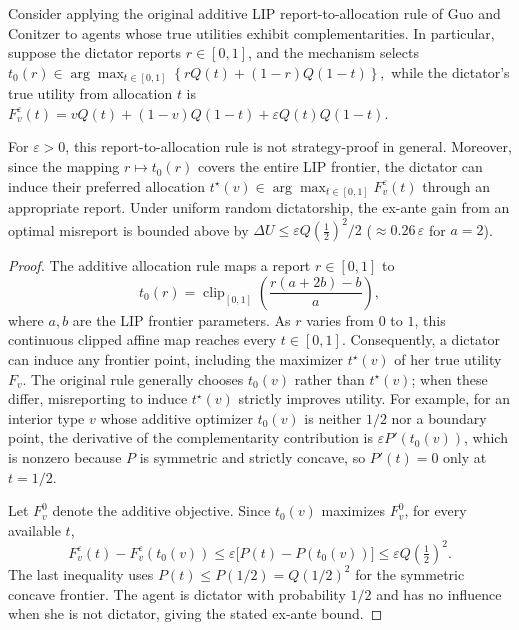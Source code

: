 \begin{proposition}
\label{prop:additive-lip}

Consider applying the original additive LIP report-to-allocation
rule of Guo and Conitzer to agents whose true utilities exhibit
complementarities. In particular, suppose the dictator reports
$r\in[0,1]$, and the mechanism selects $t_0(r)\in\arg\max_{t\in[0,1]}
\left\{rQ(t)+(1-r)Q(1-t)\right\},$
while the dictator's true utility from allocation $t$ is $F_v^\varepsilon(t)=vQ(t)+(1-v)Q(1-t)
+\varepsilon Q(t)Q(1-t).$

For $\varepsilon>0$, this report-to-allocation rule is not
strategy-proof in general. Moreover, since the mapping
$r\mapsto t_0(r)$ covers the entire LIP frontier, the dictator
can induce their preferred allocation $t^\star(v)\in\arg\max_{t\in[0,1]}F_v^\varepsilon(t)$
through an appropriate report. Under uniform random dictatorship, the ex-ante gain from
an optimal misreport is bounded above by $\Delta U\leq \varepsilon Q(\tfrac12)^2/2$ ($\approx0.26\,\varepsilon$ for $a=2$).
\end{proposition}
\begin{proof}
The additive allocation rule maps a report $r\in[0,1]$ to
\[
t_0(r)=\operatorname{clip}_{[0,1]}\!\left(\frac{r(a+2b)-b}{a}\right),
\]
where $a,b$ are the LIP frontier parameters. As $r$ varies from $0$ to
$1$, this continuous clipped affine map reaches every $t\in[0,1]$.
Consequently, a dictator can induce any frontier point, including the
maximizer $t^\star(v)$ of her true utility $F_v$.
The original rule generally chooses $t_0(v)$ rather than $t^\star(v)$;
when these differ, misreporting to induce $t^\star(v)$ strictly improves
utility. For example, for an interior type $v$ whose additive optimizer
$t_0(v)$ is neither $1/2$ nor a boundary point, the derivative of the
complementarity contribution is $\varepsilon P'(t_0(v))$, which is
nonzero because $P$ is symmetric and strictly concave, so $P'(t)=0$ only at $t=1/2$.

Let $F_v^0$ denote the additive objective. Since $t_0(v)$ maximizes $F_v^0$,
for every available $t$,
\[
F_v^\varepsilon(t)-F_v^\varepsilon(t_0(v))
\le\varepsilon\bigl[P(t)-P(t_0(v))\bigr]
\le\varepsilon Q(\tfrac12)^2.
\]
The last inequality uses $P(t)\le P(1/2)=Q(1/2)^2$ for the symmetric
concave frontier. The agent is dictator with probability $1/2$ and has
no influence when she is not dictator, giving the stated ex-ante bound.
\end{proof}

